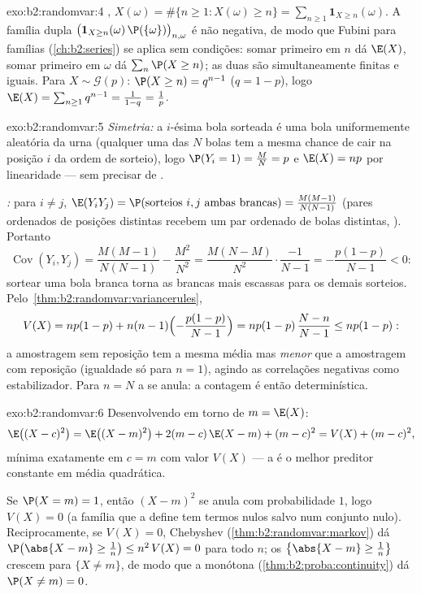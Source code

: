 \begin{solution}{exo:b2:randomvar:4}
, $X(\omega) = \#\{n \geq 1 : X(\omega) \geq n\} =
\sum_{n\geq1}\mathbf{1}_{X \geq n}(\omega)$. A família dupla
$\bigl(\mathbf{1}_{X \geq n}(\omega)\,\P(\{\omega\})\bigr)_{n,
\omega}$ é não negativa, de modo que Fubini para famílias
(\cref{ch:b2:series}) se aplica sem condições: somar primeiro em
$n$ dá $\E(X)$, somar primeiro em $\omega$ dá $\sum_n \P(X
\geq n)$; as duas são simultaneamente finitas e iguais. Para $X \sim
\mathcal{G}(p)$: $\P(X \geq n) = q^{n-1}$ ($q = 1-p$), logo $\E(X) =
\sum_{n\geq1}q^{n-1} = \frac{1}{1 - q} = \frac1p$.
\end{solution}

\begin{solution}{exo:b2:randomvar:5}
\emph{Simetria:} a $i$-ésima bola sorteada é uma bola uniformemente
aleatória da urna (qualquer uma das $N$ bolas tem a mesma chance de cair na
posição $i$ da ordem de sorteio), logo $\P(Y_i = 1) = \frac MN =
p$ e $\E(X) = np$ por linearidade --- sem precisar de .

\emph{:} para $i \neq j$, $\E(Y_iY_j) = \P(\text{sorteios }
i, j \text{ ambas brancas}) = \frac{M(M-1)}{N(N-1)}$ (pares ordenados
de posições distintas recebem um par ordenado de bolas distintas,
). Portanto
\[
\operatorname{Cov}(Y_i, Y_j)
= \frac{M(M-1)}{N(N-1)} - \frac{M^2}{N^2}
= \frac{M(N - M)}{N^2}\cdot\frac{-1}{N-1}
= -\frac{p(1-p)}{N-1} < 0 :
\]
sortear uma bola branca torna as brancas mais escassas para os demais sorteios.
Pelo~\cref{thm:b2:randomvar:variancerules},
\[
V(X) = np(1-p) + n(n-1)\Bigl(-\frac{p(1-p)}{N-1}\Bigr)
= np(1-p)\,\frac{N - n}{N - 1} \leq np(1-p) :
\]
a amostragem sem reposição tem a mesma média mas \emph{menor}
 que a amostragem com reposição (igualdade só para $n = 1$), agindo as
correlações negativas como estabilizador. Para $n = N$ a
 se anula: a contagem é então determinística.
\end{solution}

\begin{solution}{exo:b2:randomvar:6}
Desenvolvendo em torno de $m = \E(X)$:
\[
\E\bigl((X - c)^2\bigr)
= \E\bigl((X - m)^2\bigr) + 2(m - c)\,\E(X - m) + (m - c)^2
= V(X) + (m - c)^2 ,
\]
mínima exatamente em $c = m$ com valor $V(X)$ --- a  é
o melhor preditor constante em média quadrática.

Se $\P(X = m) = 1$, então $(X - m)^2$ se anula com probabilidade
$1$, logo $V(X) = 0$ (a família que a define tem termos nulos salvo num
conjunto nulo). Reciprocamente, se $V(X) = 0$, Chebyshev
(\cref{thm:b2:randomvar:markov}) dá $\P\bigl(\abs{X - m} \geq
\frac1n\bigr) \leq n^2\,V(X) = 0$ para todo $n$; os 
$\bigl\{\abs{X - m} \geq \frac1n\bigr\}$ crescem para $\{X \neq
m\}$, de modo que a  monótona (\cref{thm:b2:proba:continuity})
dá $\P(X \neq m) = 0$.
\end{solution}

